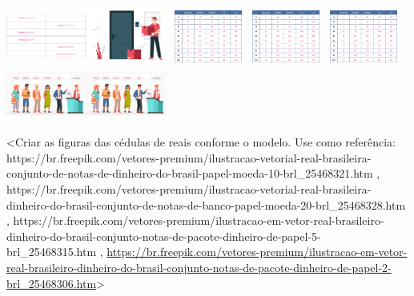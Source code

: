 \begin{escolha}
\begin{escolha}
{{{{{{{{\includegraphics[width=1.02736in,height=0.68704in]{media/image110.png}\includegraphics[width=1.09268in,height=0.73073in]{media/image112.png}\includegraphics[width=1.01042in,height=0.67572in]{media/image111.png}\includegraphics[width=1.01042in,height=0.67572in]{media/image111.png}\includegraphics[width=1.01042in,height=0.67572in]{media/image111.png}\includegraphics[width=1.04264in,height=0.69727in]{media/image113.png}\includegraphics[width=1.04264in,height=0.69727in]{media/image113.png}

\textless{}Criar as figuras das cédulas de reais conforme o modelo. Use
como referência:
https://br.freepik.com/vetores-premium/ilustracao-vetorial-real-brasileira-conjunto-de-notas-de-dinheiro-do-brasil-papel-moeda-10-brl\_25468321.htm
,
https://br.freepik.com/vetores-premium/ilustracao-vetorial-real-brasileira-dinheiro-do-brasil-conjunto-de-notas-de-banco-papel-moeda-20-brl\_25468328.htm
,
https://br.freepik.com/vetores-premium/ilustracao-em-vetor-real-brasileiro-dinheiro-do-brasil-conjunto-notas-de-pacote-dinheiro-de-papel-5-brl\_25468315.htm
,
\url{https://br.freepik.com/vetores-premium/ilustracao-em-vetor-real-brasileiro-dinheiro-do-brasil-conjunto-notas-de-pacote-dinheiro-de-papel-2-brl_25468306.htm}\textgreater{}

}}}}}}}}
\end{escolha}
\end{escolha}
